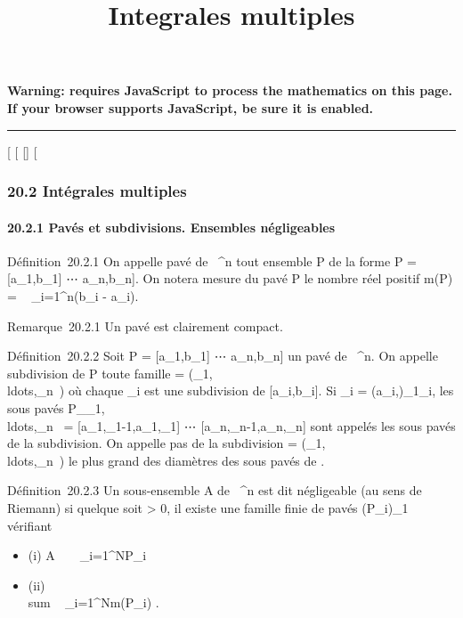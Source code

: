 \documentclass[]{article}
\title{Integrales multiples}
\author{}
\date{}
\begin{document}
\maketitle

\textbf{Warning: 
requires JavaScript to process the mathematics on this page.\\ If your
browser supports JavaScript, be sure it is enabled.}

\begin{center}\rule{3in}{0.4pt}\end{center}

{[}
{[}
{[}{]}
{[}

\subsubsection{20.2 Intégrales multiples}

\paragraph{20.2.1 Pavés et subdivisions. Ensembles négligeables}

Définition~20.2.1 On appelle pavé de ~^n tout ensemble P de
la forme P = {[}a\_1,b\_1{]}
\times⋯ \times {[}a\_n,b\_n{]}. On
notera mesure du pavé P le nombre réel positif m(P)
= \∏ ~
\_i=1^n(b\_i - a\_i).

Remarque~20.2.1 Un pavé est clairement compact.

Définition~20.2.2 Soit P = {[}a\_1,b\_1{]}
\times⋯ \times {[}a\_n,b\_n{]} un pavé
de ~^n. On appelle subdivision de P toute famille \sigma =
(\sigma\_1,\\ldots,\sigma\_n~)
où chaque \sigma\_i est une subdivision de
{[}a\_i,b\_i{]}. Si \sigma\_i =
(a\_i,\jmath)\_1\leq\jmath\leqn\_i, les sous pavés
P\_\jmath\_1,\\ldots,\jmath\_n~
= {[}a\_1,\jmath\_1-1,a\_1,\jmath\_1{]}
\times⋯ \times
{[}a\_n,\jmath\_n-1,a\_n,\jmath\_n{]} sont appelés
les sous pavés de la subdivision. On appelle pas de la subdivision \sigma =
(\sigma\_1,\\ldots,\sigma\_n~)
le plus grand des diamètres des sous pavés de \sigma.

Définition~20.2.3 Un sous-ensemble A de ~^n est dit
négligeable (au sens de Riemann) si quelque soit \epsilon \textgreater{} 0, il
existe une famille finie de pavés (P\_i)\_1\leqi\leqN
vérifiant

\begin{itemize}
\itemsep1pt\parskip0pt
\item
  (i) A \subset~\⋃ ~
  \_i=1^NP\_i
\item
  (ii) \\sum ~
  \_i=1^Nm(P\_i) \leq \epsilon.
\end{itemize}
\end{document}
